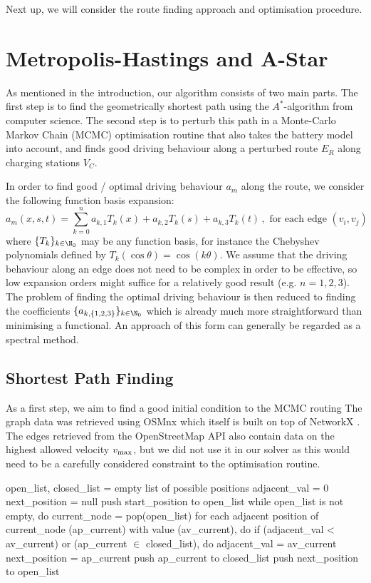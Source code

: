 \documentclass{prettytex/ox/mmsc-special-topic}
\begin{document}
  Next up, we will consider the route finding approach and optimisation procedure.

  \section{Metropolis-Hastings and A-Star}
  As mentioned in the introduction, our algorithm consists of two main parts.
  The first step is to find the geometrically shortest path using the $A^*$-algorithm from computer science.
  The second step is to perturb this path in a Monte-Carlo Markov Chain (MCMC) optimisation routine that also takes the battery model into account, and finds good driving behaviour along a perturbed route $E_R$ along charging stations $V_C$.

  In order to find good / optimal driving behaviour $a_m$ along the route, we consider the following function basis expansion:
  $$a_m(x, s, t) = \sum_{k=0}^{n} a_{k,1} T_k(x) + a_{k,2} T_k(s) + a_{k,3} T_k(t)\,, \text{ for each edge } (v_i, v_j)$$
  where $\{T_k\}_{k\in \N_0}$ may be any function basis, for instance the Chebyshev polynomials defined by $T_k(\cos \theta) = \cos(k\theta)$.
  We assume that the driving behaviour along an edge does not need to be complex in order to be effective, so low expansion orders might suffice for a relatively good result (e.g. $n = 1, 2, 3$).
  The problem of finding the optimal driving behaviour is then reduced to finding the coefficients $\{a_{k,\{1,2,3\}}\}_{k\in\N_0}$ which is already much more straightforward than minimising a functional.
  An approach of this form can generally be regarded as a spectral method.

  \subsection{Shortest Path Finding}
  As a first step, we aim to find a good initial condition to the MCMC routing
  The graph data was retrieved using OSMnx \parencite{osmnx} which itself is built on top of NetworkX \parencite{networkx}. The edges retrieved from the OpenStreetMap API also contain data on the highest allowed velocity $v_{\rm max}$, but we did not use it in our solver as this would need to be a carefully considered constraint to the optimisation routine.

  \begin{algorithm}[language=pseudo,basicstyle=\footnotesize,caption={\centering The $A^*$-search algorithm \parencite{astar}}]
open_list, closed_list = empty list of possible positions
adjacent_val = 0
next_position = null
push start_position to open_list
while open_list is not empty, do
  current_node = pop(open_list)
  for each adjacent position of current_node (ap_current)
        with value (av_current), do
    if (adjacent_val < av_current) or (ap_current $\in$ closed_list), do
      adjacent_val = av_current
      next_position = ap_current
    push ap_current to closed_list
  push next_position to open_list
  \end{algorithm}
\end{document}
